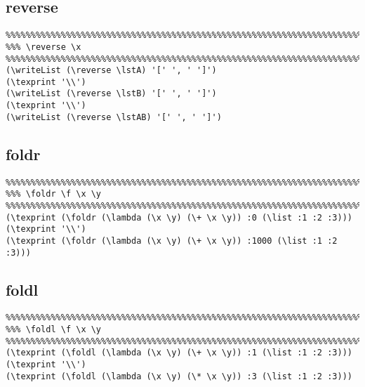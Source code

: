 \documentclass[10pt,a4paper]{article}
\begin{document}
\begin{framed}
\noindent
{}
\end{framed}

\subsection{reverse}
\begin{verbatim}
%%%%%%%%%%%%%%%%%%%%%%%%%%%%%%%%%%%%%%%%%%%%%%%%%%%%%%%%%%%%%%%%%%%%%%%%%%%%%
%%% \reverse \x  
%%%%%%%%%%%%%%%%%%%%%%%%%%%%%%%%%%%%%%%%%%%%%%%%%%%%%%%%%%%%%%%%%%%%%%%%%%%%%
(\writeList (\reverse \lstA) '[' ', ' ']')
(\texprint '\\')
(\writeList (\reverse \lstB) '[' ', ' ']')
(\texprint '\\')
(\writeList (\reverse \lstAB) '[' ', ' ']')
\end{verbatim}

\begin{framed}
\noindent
{}
\end{framed}


\subsection{foldr}
\begin{verbatim}
%%%%%%%%%%%%%%%%%%%%%%%%%%%%%%%%%%%%%%%%%%%%%%%%%%%%%%%%%%%%%%%%%%%%%%%%%%%%%
%%% \foldr \f \x \y 
%%%%%%%%%%%%%%%%%%%%%%%%%%%%%%%%%%%%%%%%%%%%%%%%%%%%%%%%%%%%%%%%%%%%%%%%%%%%%
(\texprint (\foldr (\lambda (\x \y) (\+ \x \y)) :0 (\list :1 :2 :3)))
(\texprint '\\')
(\texprint (\foldr (\lambda (\x \y) (\+ \x \y)) :1000 (\list :1 :2 :3)))
\end{verbatim}

\begin{framed}
\noindent
{}
\end{framed}

\subsection{foldl}
\begin{verbatim}
%%%%%%%%%%%%%%%%%%%%%%%%%%%%%%%%%%%%%%%%%%%%%%%%%%%%%%%%%%%%%%%%%%%%%%%%%%%%%
%%% \foldl \f \x \y 
%%%%%%%%%%%%%%%%%%%%%%%%%%%%%%%%%%%%%%%%%%%%%%%%%%%%%%%%%%%%%%%%%%%%%%%%%%%%%
(\texprint (\foldl (\lambda (\x \y) (\+ \x \y)) :1 (\list :1 :2 :3)))
(\texprint '\\')
(\texprint (\foldl (\lambda (\x \y) (\* \x \y)) :3 (\list :1 :2 :3)))
\end{verbatim}
\end{document}
